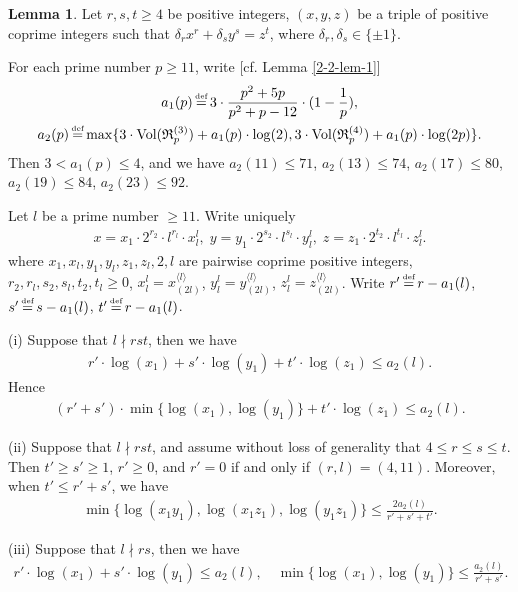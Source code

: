 \documentclass[a4paper, 12pt]{article}
\DeclareMathOperator{\defeq}{\overset{\text{\tiny{def}}}{=}}
\DeclareMathOperator{\Vol}{\text{Vol}}
\newcommand{\lagl}{\langle l \rangle}
\numberwithin{equation}{section}
\theoremstyle{definition}
\newtheorem{lem}[thm]{Lemma}
\begin{document}
\begin{lem} \label{2-2-lem-3}
Let $r,s,t \ge 4$ be positive integers, $(x,y,z)$ be a triple of positive coprime integers such that $\delta_r x^r + \delta_s y^s =  z^t$, where $\delta_r,\delta_s \in \{\pm 1\}$.

For each prime number $p\ge 11$, write [cf. Lemma \ref{2-2-lem-1}]
\small\begin{gather*}
a_1(p) \defeq 3 \cdot \frac{p^2+5p}{p^2+p-12}\cdot (1-\frac{1}{p}),  \\
a_2(p) \defeq \max\{3 \cdot \Vol(\mathfrak R_p^{(3)})  + a_1(p)\cdot \log(2), 3 \cdot \Vol(\mathfrak R_p^{(4)}) + a_1(p)\cdot \log(2p) \} .
\end{gather*}\normalsize
Then $3 < a_1(p) \le 4$, and we have $a_2(11) \le 71$, $a_2(13) \le 74$, $a_2(17) \le 80$, $a_2(19) \le 84$, $a_2(23) \le 92$.

Let $l$ be a prime number $\ge 11$.
Write uniquely \small\begin{gather}  \label{2-3-eq0}
x = x_1 \cdot 2^{r_2} \cdot l^{r_l} \cdot x_l^{l}, \;
y = y_1 \cdot 2^{s_2} \cdot l^{s_l} \cdot y_l^{l}, \;
z = z_1 \cdot 2^{t_2} \cdot l^{t_l} \cdot z_l^{l}.
\end{gather}\normalsize
where $x_1, x_l, y_1, y_l, z_1, z_l, 2, l$ are pairwise coprime positive integers, 
$r_2, r_l, s_2, s_l, t_2, t_l \ge 0$, 
$x_l^l = x_{(2l)}^{\lagl}$, $y_l^l = y_{(2l)}^{\lagl}$, $z_l^l = z_{(2l)}^{\lagl}$.
Write $r' \defeq r - a_1(l)$,  $s' \defeq s - a_1(l)$,  $t' \defeq r - a_1(l)$.

(i) Suppose that $l \nmid rst$, then we have
\small\begin{align} \label{2-3-eq1}
r'\cdot \log(x_1) + s'\cdot \log(y_1) + t'\cdot \log(z_1) \le a_2(l).
\end{align}\normalsize
Hence \small\begin{align}  \label{2-3-eq3}
(r' + s') \cdot \min\{\log(x_1), \log(y_1) \} + t' \cdot \log(z_1) \le a_2(l).
\end{align}\normalsize

(ii) Suppose that $l \nmid rst$, and assume without loss of generality that $4 \le r \le s \le t$.
Then $t' \ge s' \ge 1$, $r' \ge 0$, and $r' = 0$ if and only if $(r,l) = (4,11)$.
Moreover, when $t' \le r' + s'$, we have
\small\begin{align}  \label{2-3-eq2}
\min\{\log(x_1 y_1), \log(x_1 z_1), \log(y_1 z_1) \} \le  \frac{2a_2(l)}{ r' + s' + t' }.
\end{align}\normalsize

(iii) Suppose that $l \nmid rs$, then we have
\small\begin{align} \label{2-3-eq1a}
r'\cdot \log(x_1) + s'\cdot \log(y_1) \le a_2(l), \quad
\min\{\log(x_1), \log(y_1)\} \le \frac{a_2(l)}{r' + s'}.
\end{align}\normalsize

\end{lem}
\end{document}
